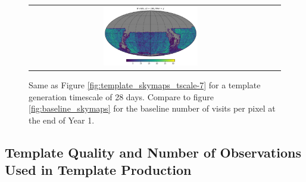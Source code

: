 \documentclass[preprintm,linenumbers]{aastex631}
\begin{document}
\begin{figure}
\begin{tabular}{c c}
				\includegraphics[width=0.4\textwidth]{results/skymaps/skymap_first_year_one_snap_v4_0_10yrs_db_noDD_noTwi_tscale-28_nside-256_doAllTemplateMetrics_reduceCount_y_noDD_noTwi.pdf} \\
			\end{tabular}
			\caption{Same as Figure \ref{fig:template_skymaps_tscale-7} for a template generation timescale of 28 days.
				Compare to figure \ref{fig:baseline_skymaps} for the baseline number of visits per pixel at the end of Year 1.
			}
			\label{fig:template_skymaps_tscale-28}
		\end{figure}

  


		\subsection{Template Quality and Number of Observations Used in Template Production}
		
\end{document}
